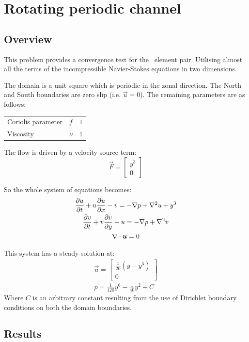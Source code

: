 \section{Rotating periodic channel}
\label{sec:periodic_channel}

\subsection{Overview}

This problem provides a convergence test for the \PoDGPt\ element pair.
Utilising almost all the terms of the incompressible Navier-Stokes equations
in two dimensions.

The domain is a unit square which is periodic in the zonal direction. The
North and South boundaries are zero slip (i.e. $\vec{u}=0$). The remaining
parameters are as follows:

\begin{tabular}{lll}
  Coriolis parameter & $f$ & $1$ \\
  Viscosity & $\nu$ & $1$ 
\end{tabular}

The flow is driven by a velocity source term:
\begin{equation}
  \vec{F}=
  \begin{bmatrix}
    y^3 \\
    0
  \end{bmatrix}
\end{equation}

So the whole system of equations becomes:
\begin{gather}
  \ppt{u}+u\ppt[x]{u}-v=-\grad p + \grad^2 u +y^3\\
  \ppt{v}+v\ppt[y]{v}+u=-\grad p + \grad^2 v\\
  \div\vec{u}=0
\end{gather}

This system has a steady solution at:
\begin{gather}
  \vec{u}=
  \begin{bmatrix}
    \frac{1}{20}(y-y^5)\\
    0
  \end{bmatrix}\\
  p=\frac{1}{120}y^6-\frac{1}{40}y^2+C
\end{gather}
Where $C$ is an arbitrary constant resulting from the use of Dirichlet
boundary conditions on both the domain boundaries.

\subsection{Results}

